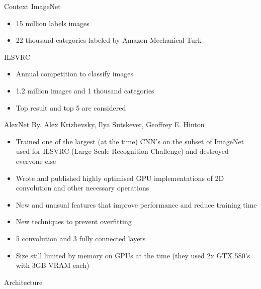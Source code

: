 \documentclass{beamer}
\begin{document}
\begin{frame}{Context}
	ImageNet
	\begin{itemize}
		\item 15 million labels images
		\item 22 thousand categories labeled by Amazon Mechanical Turk
	\end{itemize}
	ILSVRC
	\begin{itemize}
		\item Annual competition to classify images
		\item 1.2 million images and 1 thousand categories
		\item Top result and top 5 are considered
	\end{itemize}
\end{frame}



\begin{frame}{AlexNet}
By. Alex Krizhevsky, Ilya Sutskever, Geoffrey E. Hinton
\begin{itemize}
	\item Trained one of the largest (at the time) CNN's on the subset of ImageNet used for ILSVRC (Large Scale Recognition Challenge) and destroyed everyone else
	\item Wrote and published highly optimised GPU implementations of 2D convolution and other necessary operations
	\item New and unusual features that improve performance and reduce training time
	\item New techniques to prevent overfitting
	\item 5 convolution and 3 fully connected layers
	\item Size still limited by memory on GPUs at the time (they used 2x GTX 580's with 3GB VRAM each)
\end{itemize}
\end{frame}



\begin{frame}

	\begin{center}
		\Huge Architecture
	\end{center}
\end{frame}
\end{document}
